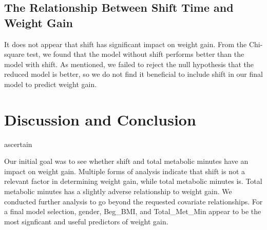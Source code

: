 \documentclass[]{article}
\begin{document}
\hypertarget{the-relationship-between-shift-time-and-weight-gain}{%
\subsection{The Relationship Between Shift Time and Weight
Gain}\label{the-relationship-between-shift-time-and-weight-gain}}

It does not appear that shift has significant impact on weight gain.
From the Chi-square test, we found that the model without shift performs
better than the model with shift. As mentioned, we failed to reject the
null hypothesis that the reduced model is better, so we do not find it
beneficial to include shift in our final model to predict weight gain.

\hypertarget{discussion-and-conclusion}{%
\section{Discussion and Conclusion}\label{discussion-and-conclusion}}

ascertain

Our initial goal was to see whether shift and total metabolic minutes
have an impact on weight gain. Multiple forms of analysis indicate that
shift is not a relevant factor in determining weight gain, while total
metabolic minutes is. Total metabolic minutes has a slightly adverse
relationship to weight gain. We conducted further analysis to go beyond
the requested covariate relationships. For a final model selection,
gender, Beg\_BMI, and Total\_Met\_Min appear to be the most signficant
and useful predictors of weight gain.
\end{document}
